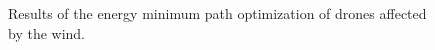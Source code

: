 \documentclass[journal]{./template/IEEEtran}
\begin{document}
\begin{figure}[ht!p!b]
\caption{Results of the energy minimum path optimization of drones affected by the wind.}
\label{fig: wind_opt}
\end{figure}
\end{document}
